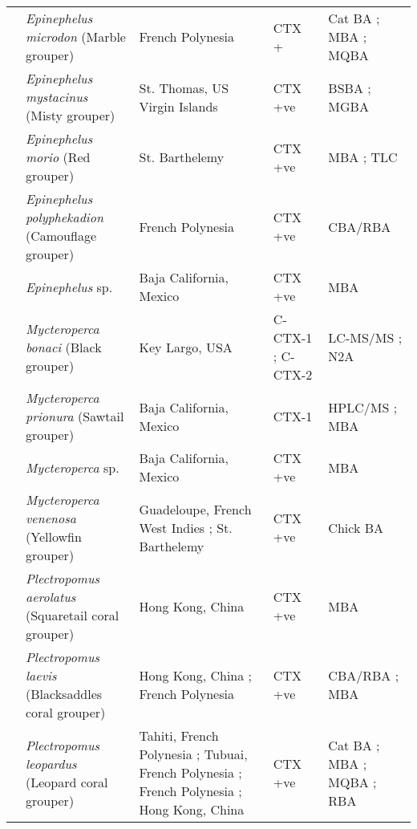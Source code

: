 \documentclass[12pt]{article}
\begin{document}
\begin{longtable}{  | p{2cm} | p{3cm} | p{4.5cm}  | p{2cm} | p{3cm}  | }
  &  \emph{Epinephelus microdon} (Marble grouper) & French Polynesia \cite{bagnis1987use} & CTX +\cite{bagnis1987use} & Cat BA \cite{bagnis1987use}; MBA \cite{bagnis1987use}; MQBA \cite{bagnis1987use} \\
  & \emph{Epinephelus mystacinus} (Misty grouper)  & St. Thomas, US Virgin Islands \cite{granade1976ciguatera} & CTX +ve \cite{granade1976ciguatera} & BSBA \cite{granade1976ciguatera}; MGBA \cite{granade1976ciguatera} \\
  & \emph{Epinephelus morio} (Red grouper) & St. Barthelemy \cite{vernoux1986heterogeneity} & CTX +ve\cite{vernoux1986heterogeneity} & MBA \cite{vernoux1986heterogeneity}; TLC \cite{vernoux1986heterogeneity} \\
    & \emph{Epinephelus polyphekadion} (Camouflage grouper) & French Polynesia \cite{chinain2014mail} & CTX +ve \cite{chinain2014mail} & CBA/RBA \cite{chinain2014mail} \\
  &  \emph{Epinephelus} sp. & Baja California, Mexico \cite{lechuga1995documented} & CTX +ve \cite{lechuga1995documented} & MBA \cite{lechuga1995documented} \\
  & \emph{Mycteroperca bonaci}  (Black grouper) & Key Largo, USA  \cite{dickey2008ciguatera} & C-CTX-1 \cite{dickey2008ciguatera}; C-CTX-2 \cite{dickey2008ciguatera} & LC-MS/MS \cite{dickey2008ciguatera}; N2A \cite{dickey2008ciguatera} \\
  & \emph{Mycteroperca prionura} (Sawtail grouper) & Baja California, Mexico \cite{sierra1998overview} & CTX-1 \cite{sierra1998overview} & HPLC/MS \cite{sierra1998overview}; MBA \cite{sierra1998overview} \\
  &  \emph{Mycteroperca} sp. & Baja California, Mexico \cite{lechuga1995documented} & CTX +ve \cite{lechuga1995documented} & MBA \cite{lechuga1995documented} \\
  & \emph{Mycteroperca venenosa}  (Yellowfin grouper) & Guadeloupe, French West Indies \cite{}; St. Barthelemy \cite{} & CTX +ve \cite{} & Chick BA \cite{}\\
  & \emph{Plectropomus aerolatus} (Squaretail coral grouper) & Hong Kong, China \cite{wong2005study} & CTX +ve \cite{wong2005study} & MBA \cite{wong2005study} \\
  &  \emph{Plectropomus laevis} (Blacksaddles coral grouper) & Hong Kong, China \cite{wong2008features}; French Polynesia \cite{chinain2014mail} & CTX +ve \cite{wong2008features,chinain2014mail} & CBA/RBA \cite{chinain2014mail}; MBA \cite{wong2008features}\\
  & \emph{Plectropomus leopardus}  (Leopard coral grouper) & Tahiti, French Polynesia \cite{pompon1983ciguatera}; Tubuai, French Polynesia \cite{darius2007ciguatera}; French Polynesia \cite{bagnis1987use}; Hong Kong, China \cite{wong2005study} & CTX +ve \cite{wong2005study,darius2007ciguatera,bagnis1987use,pompon1983ciguatera} & Cat BA \cite{bagnis1987use}; MBA \cite{wong2005study,bagnis1987use,pompon1983ciguatera}; MQBA \cite{bagnis1987use}; RBA \cite{darius2007ciguatera} \\

\end{longtable}
\end{document}
